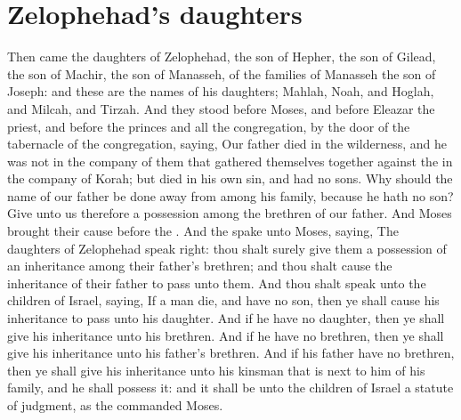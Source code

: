 \section*{Zelophehad's daughters}
\begin{biblechapter} %
\verse Then came the daughters of Zelophehad, the son of Hepher, the son of Gilead, the son of Machir, the son of Manasseh, of the families of Manasseh the son of Joseph: and these are the names of his daughters; Mahlah, Noah, and Hoglah, and Milcah, and Tirzah.
\verse And they stood before Moses, and before Eleazar the priest, and before the princes and all the congregation, by the door of the tabernacle of the congregation, saying,
\verse Our father died in the wilderness, and he was not in the company of them that gathered themselves together against the \LORD in the company of Korah; but died in his own sin, and had no sons.
\verse Why should the name of our father be done away from among his family, because he hath no son? Give unto us therefore a possession among the brethren of our father.
\verse And Moses brought their cause before the \LORD.
\verse And the \LORD spake unto Moses, saying,
\verse The daughters of Zelophehad speak right: thou shalt surely give them a possession of an inheritance among their father's brethren; and thou shalt cause the inheritance of their father to pass unto them.
\verse And thou shalt speak unto the children of Israel, saying, If a man die, and have no son, then ye shall cause his inheritance to pass unto his daughter.
\verse And if he have no daughter, then ye shall give his inheritance unto his brethren.
\verse And if he have no brethren, then ye shall give his inheritance unto his father's brethren.
\verse And if his father have no brethren, then ye shall give his inheritance unto his kinsman that is next to him of his family, and he shall possess it: and it shall be unto the children of Israel a statute of judgment, as the \LORD commanded Moses.

\end{biblechapter}
